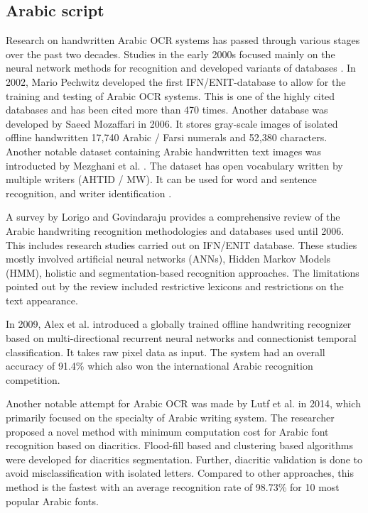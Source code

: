 \documentclass{article}
\begin{document}
\subsection{Arabic script}

Research on handwritten Arabic OCR systems has passed through various stages over the past two decades. Studies in the early 2000s focused mainly on the neural network methods for recognition and developed variants of databases \cite{mezghani2002line}. In 2002, Mario Pechwitz \cite{pechwitz2002ifn} developed the first IFN/ENIT-database to allow for the training and testing of Arabic OCR systems. This is one of the highly cited databases and has been cited more than 470 times. Another database was developed by Saeed Mozaffari \cite{mozaffari2006comprehensive,mozaffari2009icdar} in 2006. It stores gray-scale images of isolated offline handwritten 17,740 Arabic / Farsi numerals and 52,380 characters. Another notable dataset containing Arabic handwritten text images was introducted by Mezghani et al. \cite{mezghani2012database}. The dataset has open vocabulary written by multiple writers (AHTID / MW). It can be used for word and sentence recognition, and writer identification \cite{khayyat2014learning}. 


A survey by Lorigo and Govindaraju \cite{lorigo2006offline} provides a comprehensive review of the Arabic handwriting recognition methodologies and databases used until 2006. This includes research studies carried out on IFN/ENIT database. These studies mostly involved artificial neural networks (ANNs), Hidden Markov Models (HMM), holistic and segmentation-based recognition approaches. The limitations pointed out by the review included restrictive lexicons and restrictions on the text appearance. 




In 2009, Alex et al. \cite{graves2009offline} introduced a globally trained offline handwriting recognizer based on multi-directional recurrent neural networks and connectionist temporal classification. It takes raw pixel data as input. The system had an overall accuracy of 91.4\% which also won the international Arabic recognition competition. 

Another notable attempt for Arabic OCR was made by Lutf et al. \cite{lutf2014arabic} in 2014, which primarily focused on the specialty of Arabic writing system. The researcher proposed a novel method with minimum computation cost for Arabic font recognition based on diacritics. Flood-fill based and clustering based algorithms were  developed for diacritics segmentation. Further, diacritic validation is done to avoid misclassification with isolated letters. Compared to other approaches, this method is the fastest with an average recognition rate of 98.73\% for 10 most popular Arabic fonts.
\end{document}
